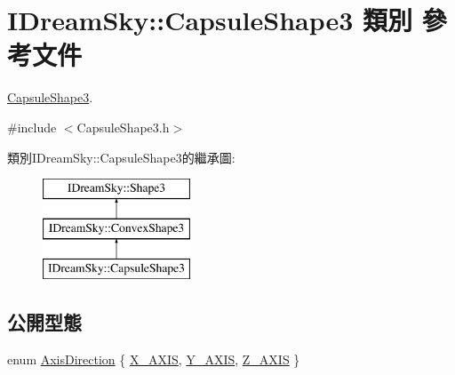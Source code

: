 \hypertarget{class_i_dream_sky_1_1_capsule_shape3}{}\section{I\+Dream\+Sky\+:\+:Capsule\+Shape3 類別 參考文件}
\label{class_i_dream_sky_1_1_capsule_shape3}


\hyperlink{class_i_dream_sky_1_1_capsule_shape3}{Capsule\+Shape3}.  




{\ttfamily \#include $<$Capsule\+Shape3.\+h$>$}

類別\+I\+Dream\+Sky\+:\+:Capsule\+Shape3的繼承圖\+:\begin{figure}[H]
\begin{center}
\leavevmode
\includegraphics[height=3.000000cm]{class_i_dream_sky_1_1_capsule_shape3}
\end{center}
\end{figure}
\subsection*{公開型態}
\begin{DoxyCompactItemize}
\item 
enum \hyperlink{class_i_dream_sky_1_1_capsule_shape3_a435aa30527ec5f54ddb8242904e50d13}{Axis\+Direction} \{ \hyperlink{class_i_dream_sky_1_1_capsule_shape3_a435aa30527ec5f54ddb8242904e50d13a9951c0f4c159ad618b10e7042dc2f45e}{X\+\_\+\+A\+X\+IS}, 
\hyperlink{class_i_dream_sky_1_1_capsule_shape3_a435aa30527ec5f54ddb8242904e50d13a30be620945b3884facdfc37ac88155ab}{Y\+\_\+\+A\+X\+IS}, 
\hyperlink{class_i_dream_sky_1_1_capsule_shape3_a435aa30527ec5f54ddb8242904e50d13ad47ecb4d27406746f3d2d8b604e82624}{Z\+\_\+\+A\+X\+IS}
 \}
\end{DoxyCompactItemize}
